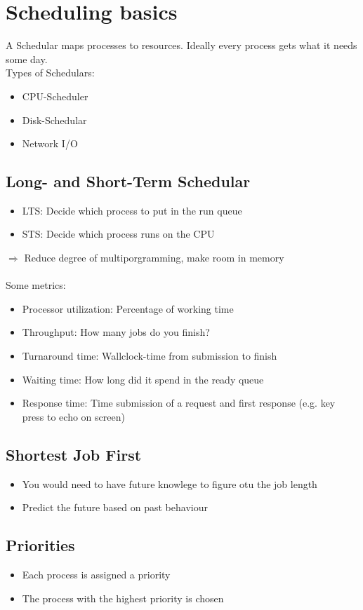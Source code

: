 \documentclass{kit}
\begin{document}
\section{Scheduling basics}
  A Schedular maps processes to resources. Ideally every process gets what it needs some day.\\
  Types of Schedulars:
  \begin{itemize}
    \item CPU-Scheduler    
    \item Disk-Schedular
    \item Network I/O
  \end{itemize}
  \subsection{Long- and Short-Term Schedular}
    \begin{itemize}
      \item LTS: Decide which process to put in the run queue
      \item STS: Decide which process runs on the CPU
    \end{itemize}
    $\Rightarrow$ Reduce degree of multiporgramming, make room in memory\\\\
    Some metrics:
    \begin{itemize}
      \item Processor utilization: Percentage of working time
      \item Throughput: How many jobs do you finish?
      \item Turnaround time: Wallclock-time from submission to finish
      \item Waiting time: How long did it spend in the ready queue
      \item Response time: Time submission of a request and first response (e.g. key press to echo on screen) 
    \end{itemize}
  \subsection{Shortest Job First}
    \begin{itemize}
      \item You would need to have future knowlege to figure otu the job length
      \item Predict the future based on past behaviour
    \end{itemize}
  \subsection{Priorities}
    \begin{itemize}
      \item Each process is assigned a priority
      \item The process with the highest priority is chosen
    \end{itemize}
\end{document}
